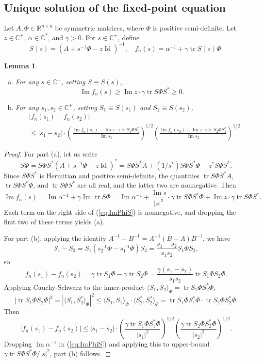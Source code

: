\documentclass{article}
\newtheorem{lemma}[theorem]{Lemma}
\theoremstyle{definition}
\newcommand{\R}{\mathbb{R}}
\newcommand{\C}{\mathbb{C}}
\newcommand{\Id}{\operatorname{Id}}
\newcommand{\tr}{\operatorname{tr}}
\newcommand{\1}{\mathbf{1}}
\renewcommand{\Im}{\operatorname{Im}}
\begin{document}
\subsection{Unique solution of the fixed-point equation}

Let $A,\Phi \in \R^{n \times n}$ be symmetric matrices, where $\Phi$ is
positive semi-definite. Let $z \in \C^+$, $\alpha \in \C^*$, and $\gamma>0$.
For $s \in \C^+$, define
\[S(s)=(A+s^{-1}\Phi-z\Id)^{-1}, \quad
f_n(s)=\alpha^{-1}+\gamma \tr S(s)\Phi.\]

\begin{lemma}\label{lemma:fixedpointfiniten}
\begin{enumerate}[(a)]
\item For any $s \in \C^+$, setting $S \equiv S(s)$,
\[\Im f_n(s) \geq \Im z \cdot \gamma \tr S\Phi S^* \geq 0.\]
\item For any $s_1,s_2 \in \C^+$, setting $S_1 \equiv S(s_1)$ 
and $S_2 \equiv S(s_2)$,
\begin{align*}
&|f_n(s_1)-f_n(s_2)|\\
& \leq
|s_1-s_2| \cdot \left(\frac{\Im f_n(s_1)-\Im z \cdot \gamma \tr S_1\Phi S_1^*}{\Im s_1}\right)^{1/2}
\left(\frac{\Im f_n(s_2)-\Im z \cdot \gamma \tr S_2\Phi S_2^*}{\Im
s_2}\right)^{1/2}
\end{align*}
\end{enumerate}
\end{lemma}
\begin{proof}
For part (a), let us write
\[S\Phi=S\Phi S^*(A+s^{-1}\Phi-z\Id)^*
=S\Phi S^*A+(1/s^*)S\Phi S^*\Phi-z^* S\Phi S^*.\]
Since $S\Phi S^*$ is Hermitian and positive semi-definite, the quantities
$\tr S\Phi S^*A$, $\tr S\Phi S^* \Phi$, and $\tr S\Phi S^*$ are all real, and
the latter two are nonnegative. Then
\begin{equation}\label{eq:ImPhiS}
\Im f_n(s)=\Im \alpha^{-1}+\gamma \Im \tr S\Phi=
\Im \alpha^{-1}+\frac{\Im s}{|s|^2} \cdot \gamma \tr S\Phi S^*\Phi+\Im z \cdot
\gamma\tr S\Phi S^*.
\end{equation}
Each term on the right side of (\ref{eq:ImPhiS}) is nonnegative, and dropping
the first two of these terms yields (a).

For part (b), applying the identity $A^{-1}-B^{-1}=A^{-1}(B-A)B^{-1}$, we have
\[S_1-S_2=S_1(s_2^{-1}\Phi-s_1^{-1}\Phi)S_2=\frac{s_1-s_2}{s_1s_2}S_1\Phi S_2,\]
so
\[f_n(s_1)-f_n(s_2)=\gamma \tr S_1\Phi-\gamma \tr S_2\Phi
=\frac{\gamma(s_1-s_2)}{s_1s_2}\tr S_1\Phi S_2\Phi.\]
Applying Cauchy-Schwarz to the inner-product $\langle S_1,S_2 \rangle_\Phi=\tr
S_1\Phi S_2^*\Phi$,
\[|\tr S_1\Phi S_2\Phi|^2
=|\langle S_1,S_2^* \rangle_\Phi|^2
\leq \langle S_1,S_1 \rangle_\Phi \cdot \langle S_2^*,S_2^* \rangle_\Phi
= \tr S_1\Phi S_1^*\Phi \cdot \tr S_2\Phi S_2^* \Phi.\]
Then
\[|f_n(s_1)-f_n(s_2)| \leq |s_1-s_2| \cdot
\left(\frac{\gamma \tr S_1\Phi S_1^*\Phi}{|s_1|^2}\right)^{1/2}
\left(\frac{\gamma \tr S_2\Phi S_2^* \Phi}{|s_2|^2}\right)^{1/2}.\]
Dropping $\Im \alpha^{-1}$ in (\ref{eq:ImPhiS}) and applying this
to upper-bound $\gamma \tr S\Phi S^*\Phi/|s|^2$, part (b) follows.
\end{proof}
\end{document}
